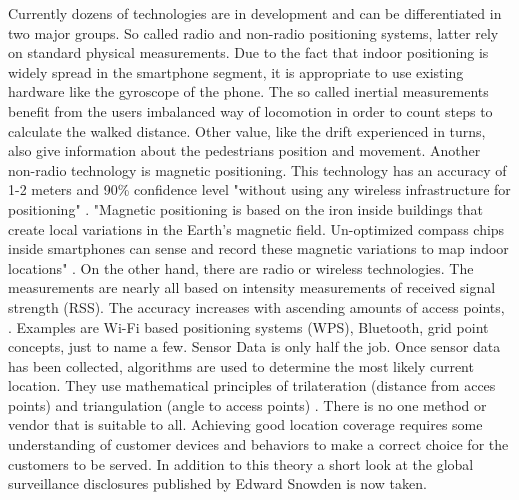 




Currently dozens of technologies are in development and can be differentiated in two major groups. So called radio and non-radio positioning systems, latter rely on standard physical measurements. Due to the fact that indoor positioning is widely spread in the smartphone segment, it is appropriate to use existing hardware like the gyroscope of the phone. The so called inertial measurements benefit from the users imbalanced way of locomotion in order to count steps to calculate the walked distance. Other value, like the drift experienced in turns, also give information about the pedestrians position and movement. Another non-radio technology is magnetic positioning. This technology has an accuracy of 1-2 meters and 90\% confidence level "without using any wireless infrastructure for positioning" \textcite{geoSpital}. "Magnetic positioning is based on the iron inside buildings that create local variations in the Earth's magnetic field. Un-optimized compass chips inside smartphones can sense and record these magnetic variations to map indoor locations" \textcite{geoSpital}.
On the other hand, there are radio or wireless technologies. The measurements are nearly all based on intensity measurements of received signal strength (RSS). The accuracy increases with ascending amounts of access points, \textcite{indoorGeolocation}. Examples are Wi-Fi based positioning systems (WPS), Bluetooth, grid point concepts, just to name a few. 
Sensor Data is only half the job. Once sensor data has been collected, algorithms are used to determine the most likely current location. They use mathematical principles of trilateration (distance from acces points) and triangulation (angle to access points) \parencite{measurement}. There is no one method or vendor that is suitable to all. Achieving good location coverage requires some understanding of customer devices and behaviors to make a correct choice for the customers to be served. In addition to this theory a short look at the global surveillance disclosures published by Edward Snowden is now taken. 


